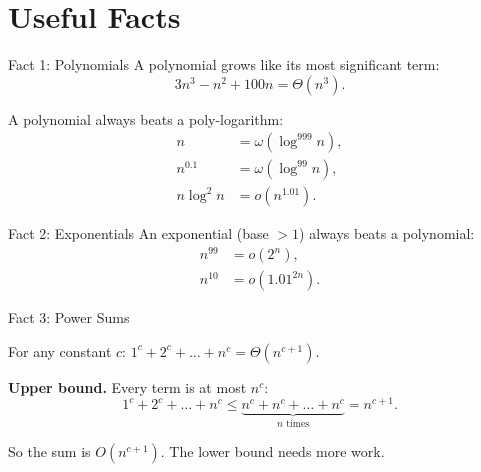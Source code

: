 \documentclass[10pt,aspectratio=169]{beamer}
\begin{document}
\section{Useful Facts}

\begin{frame}{Fact 1: Polynomials}
  A polynomial grows like its \alert{most significant term}:
  \[
    3n^3 - n^2 + 100n = \Theta(n^3).
  \]

  \bigskip
  A polynomial always beats a poly-logarithm:
  \[
    \begin{aligned}
      n           &= \omega(\log^{999} n), \\
      n^{0.1}     &= \omega(\log^{99} n), \\
      n \log^2 n  &= o(n^{1.01}).
    \end{aligned}
  \]
\end{frame}

\begin{frame}{Fact 2: Exponentials}
  An exponential (base $> 1$) always beats a polynomial:
  \[
    \begin{aligned}
      n^{99} &= o(2^n), \\
      n^{10} &= o(1.01^{2n}).
    \end{aligned}
  \]

  \bigskip
  \begin{center}
  \end{center}
\end{frame}

\begin{frame}{Fact 3: Power Sums}
  \begin{block}{}
    For any constant $c$: \quad $1^c + 2^c + \ldots + n^c = \Theta(n^{c+1})$.
  \end{block}

  \bigskip
  \textbf{Upper bound.} Every term is at most $n^c$:
  \[
    1^c + 2^c + \ldots + n^c
    \le \underbrace{n^c + n^c + \ldots + n^c}_{n \text{ times}}
    = n^{c+1}.
  \]

  \bigskip
  \begin{center}
    So the sum is $O(n^{c+1})$. The lower bound needs more work.
  \end{center}
\end{frame}
\end{document}
